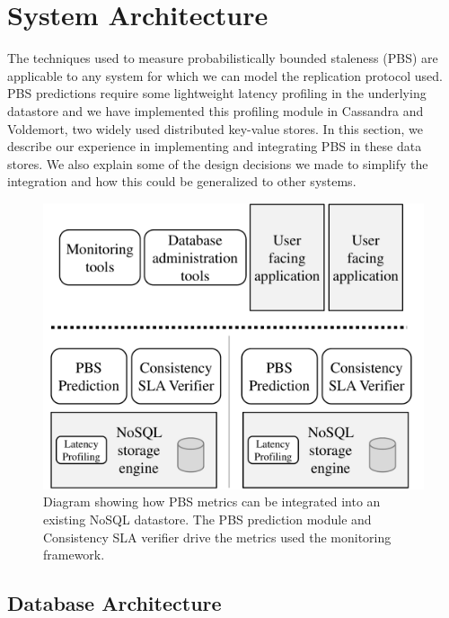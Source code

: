 \section{System Architecture}
\label{sec:architecture}

The techniques used to measure probabilistically bounded staleness (PBS) are
applicable to any system for which we can model the replication protocol used.
PBS predictions require some lightweight latency profiling in the underlying
datastore and we have implemented this profiling module in Cassandra and
Voldemort, two widely used distributed key-value stores. In this section, we
describe our experience in implementing and integrating PBS in these data
stores. We also explain some of the design decisions we made to simplify the
integration and how this could be generalized to other systems. 


\begin{figure}
\centering
\includegraphics[width=.90\columnwidth]{figs/pbs-sys-arch.pdf}
\caption{Diagram showing how PBS metrics can be integrated into an existing
NoSQL datastore. The PBS prediction module and Consistency SLA verifier drive
the metrics used the monitoring framework.}
\label{fig:pbs-sys-arch}
\end{figure}

\subsection{Database Architecture}

